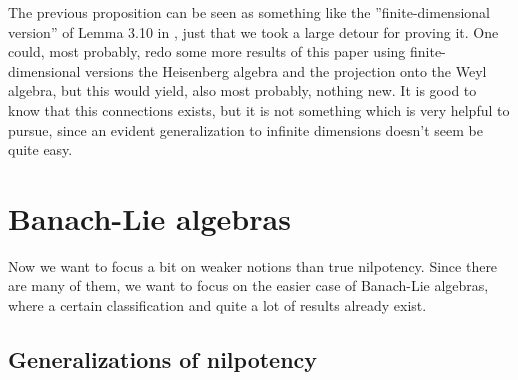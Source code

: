 The previous proposition can be seen as something like the ''finite-dimensional 
version'' of Lemma 3.10 in \cite{waldmann:2014a}, just that we took a large 
detour for proving it. One could, most probably, redo some more results of this 
paper using finite-dimensional versions the Heisenberg algebra and the 
projection onto the Weyl algebra, but this would yield, also most probably, 
nothing new. It is good to know that this connections exists, but it is not 
something which is very helpful to pursue, since an evident generalization to 
infinite dimensions doesn't seem be quite easy.




\section{Banach-Lie algebras}
\label{sec:chap6_TheEProperty}

Now we want to focus a bit on weaker notions than true nilpotency. Since there 
are many of them, we want to focus on the easier case of Banach-Lie algebras, 
where a certain classification and quite a lot of results already exist.


\subsection{Generalizations of nilpotency}

